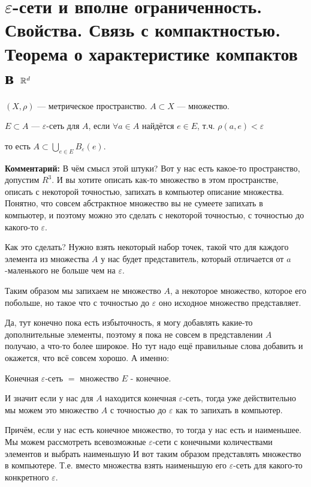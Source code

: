 \section{$\varepsilon$-сети и вполне ограниченность. Свойства. Связь с компактностью. Теорема о характеристике компактов в $\mathbb{R}^d$ \href{https://youtu.be/IwHCWoW4oes?t=5735}{\Walley}}

\begin{conj}
    $(X, \rho)$ --- метрическое пространство. $A \subset X$ --- множество.

    $E \subset A$ --- $\varepsilon$-сеть для $A$, если $\forall a \in A$ найдётся $e \in E$, т.ч. $\rho(a, e) < \varepsilon$

    то есть $A \subset \bigcup\limits_{e \in E} B_{\varepsilon}(e)$.

\end{conj}

\textbf{Комментарий:}
В чём смысл этой штуки?
Вот у нас есть какое-то пространство, допустим $R^3$.
И вы хотите описать как-то множество в этом пространстве,
описать с некоторой точностью, запихать в компьютер описание множества.
Понятно, что совсем абстрактное множество вы не сумеете запихать в компьютер,
и поэтому можно это сделать с некоторой точностью,
с точностью до какого-то $\varepsilon$. 

Как это сделать? Нужно взять некоторый набор точек,
такой что для каждого элемента из множества $A$ у нас будет представитель, который
отличается от $a$-маленького не больше чем на $\varepsilon$.

Таким образом мы запихаем не множество $A$, а некоторое множество, которое его побольше, но такое что с точностью до
$\varepsilon$ оно исходное множество представляет.

Да, тут конечно пока есть избыточность, я могу добавлять какие-то дополнительные элементы, поэтому я пока не совсем в представлении $A$ получаю, а что-то более широкое.
Но тут надо ещё правильные слова добавить и окажется, что всё совсем хорошо.
А именно:

\begin{conj}
    Конечная $\varepsilon$-сеть $=$ множество $E$ - конечное. 
\end{conj}

И значит если у нас для $A$ находится конечная $\varepsilon$-сеть, тогда уже действительно мы можем это множество $A$ с точностью до $\varepsilon$ как то запихать в компьютер.

Причём, если у нас есть конечное множество, то тогда у нас есть и наименьшее.
Мы можем рассмотреть всевозможные $\varepsilon$-сети с конечными количествами элементов и выбрать наименьшую
И вот таким образом представлять множество в компьютере. Т.е. вместо множества взять наименьшую его $\varepsilon$-сеть для какого-то конкретного $\varepsilon$.

